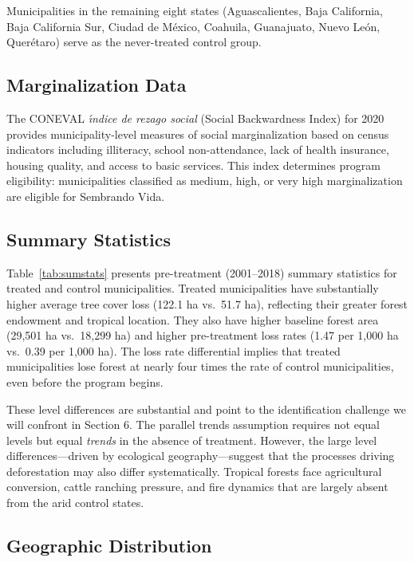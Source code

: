 \documentclass[12pt]{article}
\begin{document}
Municipalities in the remaining eight states (Aguascalientes, Baja California, Baja California Sur, Ciudad de M\'{e}xico, Coahuila, Guanajuato, Nuevo Le\'{o}n, Quer\'{e}taro) serve as the never-treated control group.

\subsection{Marginalization Data}

The CONEVAL \textit{\'{\i}ndice de rezago social} (Social Backwardness Index) for 2020 provides municipality-level measures of social marginalization based on census indicators including illiteracy, school non-attendance, lack of health insurance, housing quality, and access to basic services. This index determines program eligibility: municipalities classified as medium, high, or very high marginalization are eligible for Sembrando Vida.

\subsection{Summary Statistics}



Table~\ref{tab:sumstats} presents pre-treatment (2001--2018) summary statistics for treated and control municipalities. Treated municipalities have substantially higher average tree cover loss (122.1 ha vs.\ 51.7 ha), reflecting their greater forest endowment and tropical location. They also have higher baseline forest area (29,501 ha vs.\ 18,299 ha) and higher pre-treatment loss rates (1.47 per 1,000 ha vs.\ 0.39 per 1,000 ha). The loss rate differential implies that treated municipalities lose forest at nearly four times the rate of control municipalities, even before the program begins.

These level differences are substantial and point to the identification challenge we will confront in Section 6. The parallel trends assumption requires not equal levels but equal \textit{trends} in the absence of treatment. However, the large level differences---driven by ecological geography---suggest that the processes driving deforestation may also differ systematically. Tropical forests face agricultural conversion, cattle ranching pressure, and fire dynamics that are largely absent from the arid control states.

\subsection{Geographic Distribution}
\end{document}
